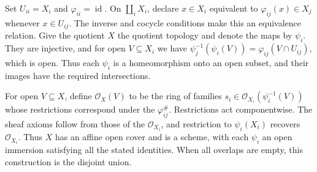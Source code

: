 Set $U_{ii}=X_i$ and $\varphi_{ii}=\operatorname{id}$. On $\coprod_iX_i$, declare $x\in X_i$ equivalent to $\varphi_{ij}(x)\in X_j$ whenever $x\in U_{ij}$. The inverse and cocycle conditions make this an equivalence relation. Give the quotient $X$ the quotient topology and denote the maps by $\psi_i$. They are injective, and for open $V\subseteq X_i$ we have $\psi_j^{-1}(\psi_i(V))=\varphi_{ij}(V\cap U_{ij})$, which is open. Thus each $\psi_i$ is a homeomorphism onto an open subset, and their images have the required intersections.

For open $V\subseteq X$, define $\mathcal O_X(V)$ to be the ring of families $s_i\in\mathcal O_{X_i}(\psi_i^{-1}(V))$ whose restrictions correspond under the $\varphi_{ij}^\#$. Restrictions act componentwise. The sheaf axioms follow from those of the $\mathcal O_{X_i}$, and restriction to $\psi_i(X_i)$ recovers $\mathcal O_{X_i}$. Thus $X$ has an affine open cover and is a scheme, with each $\psi_i$ an open immersion satisfying all the stated identities. When all overlaps are empty, this construction is the disjoint union.
